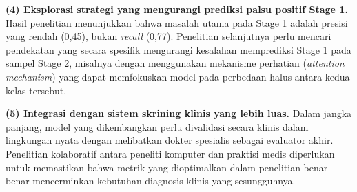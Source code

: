 \textbf{(4) Eksplorasi strategi yang mengurangi prediksi palsu positif Stage 1.} Hasil
penelitian menunjukkan bahwa masalah utama pada Stage 1 adalah presisi yang rendah (0,45),
bukan \textit{recall} (0,77). Penelitian selanjutnya perlu mencari pendekatan yang secara
spesifik mengurangi kesalahan memprediksi Stage 1 pada sampel Stage 2, misalnya dengan
menggunakan mekanisme perhatian (\textit{attention mechanism}) yang dapat memfokuskan model
pada perbedaan halus antara kedua kelas tersebut.

\textbf{(5) Integrasi dengan sistem skrining klinis yang lebih luas.} Dalam jangka panjang,
model yang dikembangkan perlu divalidasi secara klinis dalam lingkungan nyata dengan melibatkan
dokter spesialis sebagai evaluator akhir. Penelitian kolaboratif antara peneliti komputer dan
praktisi medis diperlukan untuk memastikan bahwa metrik yang dioptimalkan dalam penelitian
benar-benar mencerminkan kebutuhan diagnosis klinis yang sesungguhnya.
